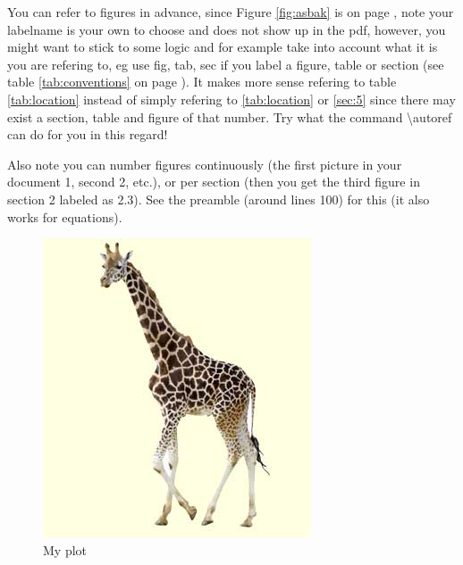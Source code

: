 \documentclass[thesis]{subfiles}
\begin{document}
You can refer to figures in advance, since Figure \ref{fig:asbak} is on page \pageref{fig:asbak}, note your labelname is your own to choose and does not show up in the pdf, however, you might want to stick to some logic and for example take into account what it is you are refering to, eg use fig, tab, sec if you label a figure, table or section (see table \ref{tab:conventions} on page \pageref{tab:conventions}). It makes more sense refering to table \ref{tab:location} instead of simply refering to \ref{tab:location} or \ref{sec:5} since there may exist a section, table and figure of that number. Try what the command \textbackslash autoref can do for you in this regard!

Also note you can number figures continuously (the first picture in your document 1, second 2, etc.), or per section (then you get the third figure in section 2 labeled as 2.3). See the preamble (around lines 100) for this (it also works for equations).

\begin{figure}[htbp] 
	\includegraphics[width=0.9\linewidth]{Giraffe_klein.jpg}
	\caption{My plot}
	\label{fig:myPlot}
\end{figure}
\end{document}
